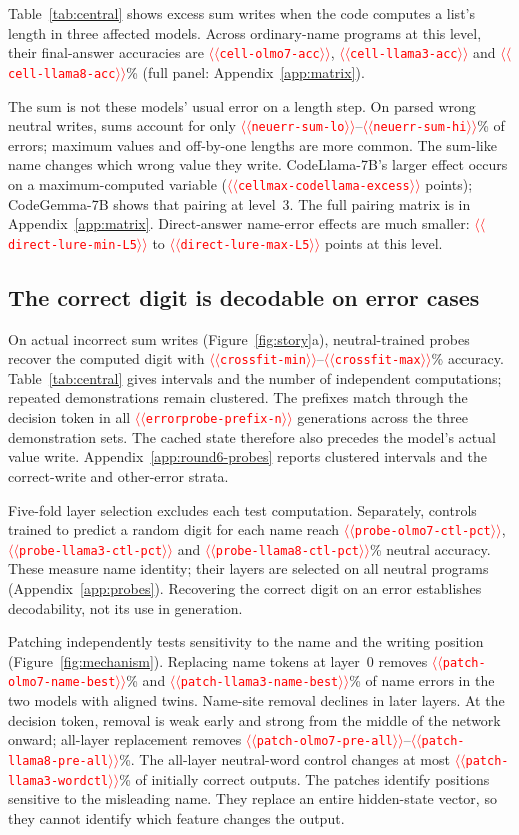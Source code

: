 \documentclass[11pt]{article}
\providecommand{\NUM}[1]{\textcolor{red}{$\langle\langle$\texttt{#1}$\rangle\rangle$}}
\begin{document}
Table~\ref{tab:central} shows excess sum writes when the code computes a list's length in
three affected models. Across ordinary-name programs at this level, their final-answer
accuracies are \NUM{cell-olmo7-acc}, \NUM{cell-llama3-acc} and \NUM{cell-llama8-acc}\%
(full panel: Appendix~\ref{app:matrix}).

The sum is not these models' usual error on a length step. On parsed wrong neutral writes, sums
account for only \NUM{neuerr-sum-lo}--\NUM{neuerr-sum-hi}\% of errors; maximum values and
off-by-one lengths are more common. The sum-like name changes which wrong value they write.
CodeLlama-7B's larger effect occurs on a maximum-computed variable
(\NUM{cellmax-codellama-excess} points); CodeGemma-7B shows that pairing at level~3.
The full pairing matrix is in Appendix~\ref{app:matrix}. Direct-answer name-error effects are much
smaller: \NUM{direct-lure-min-L5} to \NUM{direct-lure-max-L5} points at this level.



\subsection{The correct digit is decodable on error cases}

On actual incorrect sum writes (Figure~\ref{fig:story}a), neutral-trained probes recover the computed digit with
\NUM{crossfit-min}--\NUM{crossfit-max}\% accuracy. Table~\ref{tab:central} gives intervals
and the number of independent computations; repeated demonstrations remain clustered.
The prefixes match through the decision token in all \NUM{errorprobe-prefix-n} generations
across the three demonstration sets. The cached state therefore also precedes the model's
actual value write. Appendix~\ref{app:round6-probes} reports clustered intervals and the
correct-write and other-error strata.

Five-fold layer selection excludes each test computation. Separately, controls trained to
predict a random digit for each name reach \NUM{probe-olmo7-ctl-pct},
\NUM{probe-llama3-ctl-pct} and \NUM{probe-llama8-ctl-pct}\% neutral accuracy.
These measure name identity; their layers are selected on all neutral programs
(Appendix~\ref{app:probes}).
Recovering the correct digit on an error establishes decodability, not its use in generation.


Patching independently tests sensitivity to the name and the writing position
(Figure~\ref{fig:mechanism}). Replacing name tokens at layer~0 removes
\NUM{patch-olmo7-name-best}\% and \NUM{patch-llama3-name-best}\% of name errors in the two
models with aligned twins. Name-site removal declines in later layers. At the decision token,
removal is weak early and strong from the middle of the network onward; all-layer replacement
removes \NUM{patch-olmo7-pre-all}--\NUM{patch-llama8-pre-all}\%. The all-layer neutral-word control
changes at most \NUM{patch-llama3-wordctl}\% of initially correct outputs. The patches identify positions sensitive to the misleading name. They replace an entire
hidden-state vector, so they cannot identify which feature changes the output.
\end{document}
